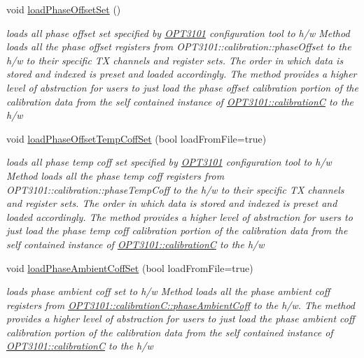 \begin{DoxyCompactItemize}
void \mbox{\hyperlink{class_o_p_t3101_1_1device_a9fed055b5998d93bd37f26388ec8b0a8}{load\+Phase\+Offset\+Set}} ()
\begin{DoxyCompactList}\small\item\em loads all phase offset set specified by \mbox{\hyperlink{namespace_o_p_t3101}{O\+P\+T3101}} configuration tool to h/w Method loads all the phase offset registers from O\+P\+T3101\+::calibration\+::phase\+Offset to the h/w to their specific TX channels and register sets. The order in which data is stored and indexed is preset and loaded accordingly. The method provides a higher level of abstraction for users to just load the phase offset calibration portion of the calibration data from the self contained instance of \mbox{\hyperlink{class_o_p_t3101_1_1calibration_c}{O\+P\+T3101\+::calibrationC}} to the h/w \end{DoxyCompactList}\item 
void \mbox{\hyperlink{class_o_p_t3101_1_1device_a69d7fbb471d186845242774d7f2c86a8}{load\+Phase\+Offset\+Temp\+Coff\+Set}} (bool load\+From\+File=true)
\begin{DoxyCompactList}\small\item\em loads all phase temp coff set specified by \mbox{\hyperlink{namespace_o_p_t3101}{O\+P\+T3101}} configuration tool to h/w Method loads all the phase temp coff registers from O\+P\+T3101\+::calibration\+::phase\+Temp\+Coff to the h/w to their specific TX channels and register sets. The order in which data is stored and indexed is preset and loaded accordingly. The method provides a higher level of abstraction for users to just load the phase temp coff calibration portion of the calibration data from the self contained instance of \mbox{\hyperlink{class_o_p_t3101_1_1calibration_c}{O\+P\+T3101\+::calibrationC}} to the h/w \end{DoxyCompactList}\item 
void \mbox{\hyperlink{class_o_p_t3101_1_1device_ac70129fa0dacd700b19349087f000f76}{load\+Phase\+Ambient\+Coff\+Set}} (bool load\+From\+File=true)
\begin{DoxyCompactList}\small\item\em loads phase ambient coff set to h/w Method loads all the phase ambient coff registers from \mbox{\hyperlink{class_o_p_t3101_1_1calibration_c_ab69d912cc3cad353abeb73d7a95b7428}{O\+P\+T3101\+::calibration\+C\+::phase\+Ambient\+Coff}} to the h/w. The method provides a higher level of abstraction for users to just load the phase ambient coff calibration portion of the calibration data from the self contained instance of \mbox{\hyperlink{class_o_p_t3101_1_1calibration_c}{O\+P\+T3101\+::calibrationC}} to the h/w \end{DoxyCompactList}\item 

\end{DoxyCompactItemize}
